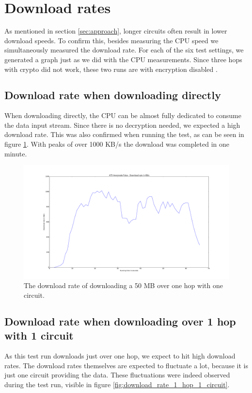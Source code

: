 \section{Download rates}
	As mentioned in section \ref{sec:approach}, longer circuits often result in lower download speeds. To confirm this, besides measuring the CPU speed we simultaneously measured the download rate. For each of the six test settings, we generated a graph just as we did with the CPU measurements. Since three hops with crypto did not work, these two runs are with encryption disabled .
	
	\subsection{Download rate when downloading directly}
		When downloading directly, the CPU can be almost fully dedicated to consume the data input stream.
		Since there is no decryption needed, we expected a high download rate. This was also confirmed when running the test, as can be seen in figure \ref{fig:download_rate_anonmode_off}. With peaks of over 1000 KB/s the download was completed in one minute.
		
			\begin{figure}[!htb]
				\centering
				\includegraphics[width=\textwidth]{graphics/download_rate_anonmode_off.pdf}
				\caption{The download rate of downloading a 50 MB over one hop with one circuit.}
				\label{fig:download_rate_anonmode_off}
			\end{figure}
			
		\subsection{Download rate when downloading over 1 hop with 1 circuit}
			As this test run downloads just over one hop, we expect to hit high download rates. The download rates themselves are expected to fluctuate a lot, because it is just one circuit providing the data. These fluctuations were indeed observed during the test run, visible in figure \ref{fig:download_rate_1_hop_1_circuit}.
			

